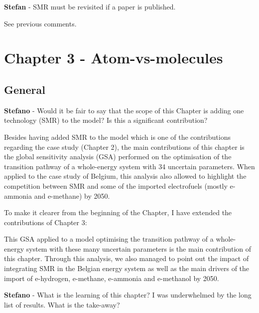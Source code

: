\documentclass[12pt,a4paper]{article}
\begin{document}
\begin{mdframed}[style=comment] %
{\color{teal} \textbf{Stefan}} - SMR must be revisited if a paper is published.
\end{mdframed}

\noindent See previous comments.

\section{Chapter 3 - Atom-vs-molecules}
\label{Chap_atom_vs_molecules}

\subsection{General}

\begin{mdframed}[style=comment] %
{\color{orange} \textbf{Stefano}} - Would it be fair to say that the scope of this Chapter is adding one technology (SMR) to the model? Is this a significant contribution?
\end{mdframed}

\noindent Besides having added SMR to the model which is one of the contributions regarding the case study (Chapter 2), the main contributions of this chapter is the global sensitivity analysis (GSA) performed on the optimisation of the transition pathway of a whole-energy system with 34 uncertain parameters. When applied to the case study of Belgium, this analysis also allowed to highlight the competition between SMR and some of the imported electrofuels (mostly e-ammonia and e-methane) by 2050. 

To make it clearer from the beginning of the Chapter, I have extended {\color{blue}the contributions of Chapter 3}:

\begin{mdframed}[style=manuscript] %
This GSA applied to a model optimising the transition pathway of a whole-energy system with these many uncertain parameters is the main contribution of this chapter. Through this analysis, we also managed to point out the impact of integrating SMR in the Belgian energy system as well as the main drivers of the import of e-hydrogen, e-methane, e-ammonia and e-methanol by 2050.
\end{mdframed}

\begin{mdframed}[style=comment] %
{\color{orange} \textbf{Stefano}} - What is the learning of this chapter? I was underwhelmed by the long list of results. What is the take-away?
\end{mdframed}
\end{document}
